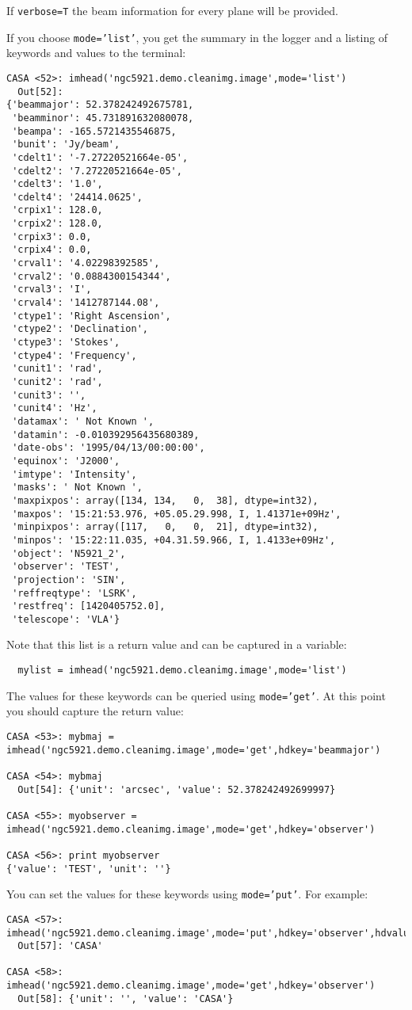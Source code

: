 If {\tt verbose=T} the beam information for every plane will be provided.

If you choose {\tt mode='list'}, you get the summary in the logger and
a listing of keywords and values to the terminal:
\footnotesize
\begin{verbatim}
CASA <52>: imhead('ngc5921.demo.cleanimg.image',mode='list')
  Out[52]: 
{'beammajor': 52.378242492675781,
 'beamminor': 45.731891632080078,
 'beampa': -165.5721435546875,
 'bunit': 'Jy/beam',
 'cdelt1': '-7.27220521664e-05',
 'cdelt2': '7.27220521664e-05',
 'cdelt3': '1.0',
 'cdelt4': '24414.0625',
 'crpix1': 128.0,
 'crpix2': 128.0,
 'crpix3': 0.0,
 'crpix4': 0.0,
 'crval1': '4.02298392585',
 'crval2': '0.0884300154344',
 'crval3': 'I',
 'crval4': '1412787144.08',
 'ctype1': 'Right Ascension',
 'ctype2': 'Declination',
 'ctype3': 'Stokes',
 'ctype4': 'Frequency',
 'cunit1': 'rad',
 'cunit2': 'rad',
 'cunit3': '',
 'cunit4': 'Hz',
 'datamax': ' Not Known ',
 'datamin': -0.010392956435680389,
 'date-obs': '1995/04/13/00:00:00',
 'equinox': 'J2000',
 'imtype': 'Intensity',
 'masks': ' Not Known ',
 'maxpixpos': array([134, 134,   0,  38], dtype=int32),
 'maxpos': '15:21:53.976, +05.05.29.998, I, 1.41371e+09Hz',
 'minpixpos': array([117,   0,   0,  21], dtype=int32),
 'minpos': '15:22:11.035, +04.31.59.966, I, 1.4133e+09Hz',
 'object': 'N5921_2',
 'observer': 'TEST',
 'projection': 'SIN',
 'reffreqtype': 'LSRK',
 'restfreq': [1420405752.0],
 'telescope': 'VLA'}
\end{verbatim}
\normalsize
Note that this list is a return value and can be captured in a
variable:
\small
\begin{verbatim}
  mylist = imhead('ngc5921.demo.cleanimg.image',mode='list')
\end{verbatim}
\normalsize

The values for these keywords can be queried using {\tt mode='get'}.
At this point you should capture the return value:
\small
\begin{verbatim}
CASA <53>: mybmaj = imhead('ngc5921.demo.cleanimg.image',mode='get',hdkey='beammajor')

CASA <54>: mybmaj
  Out[54]: {'unit': 'arcsec', 'value': 52.378242492699997}

CASA <55>: myobserver = imhead('ngc5921.demo.cleanimg.image',mode='get',hdkey='observer')

CASA <56>: print myobserver
{'value': 'TEST', 'unit': ''}
\end{verbatim}
\normalsize

You can set the values for these keywords using
{\tt mode='put'}.  For example:
\small
\begin{verbatim}
CASA <57>: imhead('ngc5921.demo.cleanimg.image',mode='put',hdkey='observer',hdvalue='CASA')
  Out[57]: 'CASA'

CASA <58>: imhead('ngc5921.demo.cleanimg.image',mode='get',hdkey='observer')
  Out[58]: {'unit': '', 'value': 'CASA'}
\end{verbatim}
\normalsize


